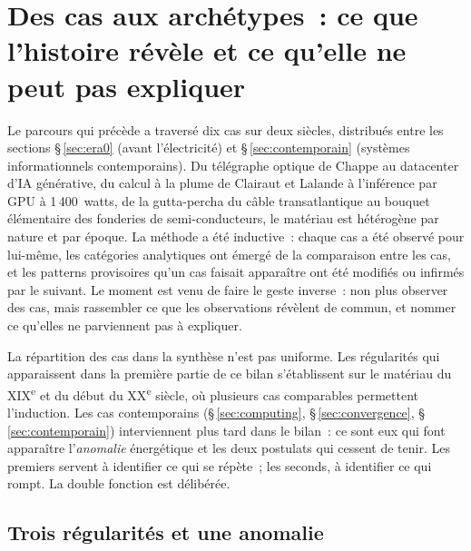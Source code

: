 \section{Des cas aux archétypes~: ce que l'histoire révèle et ce qu'elle ne peut pas expliquer}\label{sec:reduction}

Le parcours qui précède a traversé dix cas sur deux siècles, distribués entre les sections §\,\ref{sec:era0} (avant l'électricité) et §\,\ref{sec:contemporain} (systèmes informationnels contemporains). Du télégraphe optique de Chappe au datacenter d'IA générative, du calcul à la plume de Clairaut et Lalande à l'inférence par GPU à 1\,400~watts, de la gutta-percha du câble transatlantique au bouquet élémentaire des fonderies de semi-conducteurs, le matériau est hétérogène par nature et par époque. La méthode a été inductive~: chaque cas a été observé pour lui-même, les catégories analytiques ont émergé de la comparaison entre les cas, et les patterns provisoires qu'un cas faisait apparaître ont été modifiés ou infirmés par le suivant. Le moment est venu de faire le geste inverse~: non plus observer des cas, mais rassembler ce que les observations révèlent de commun, et nommer ce qu'elles ne parviennent pas à expliquer.

La répartition des cas dans la synthèse n'est pas uniforme. Les régularités qui apparaissent dans la première partie de ce bilan s'établissent sur le matériau du XIX\textsuperscript{e} et du début du XX\textsuperscript{e} siècle, où plusieurs cas comparables permettent l'induction. Les cas contemporains (§\,\ref{sec:computing}, §\,\ref{sec:convergence}, §\,\ref{sec:contemporain}) interviennent plus tard dans le bilan~: ce sont eux qui font apparaître l'\emph{anomalie} énergétique et les deux postulats qui cessent de tenir. Les premiers servent à identifier ce qui se répète~; les seconds, à identifier ce qui rompt. La double fonction est délibérée.

\subsection{Trois régularités et une anomalie}\label{subsec:regularites}

